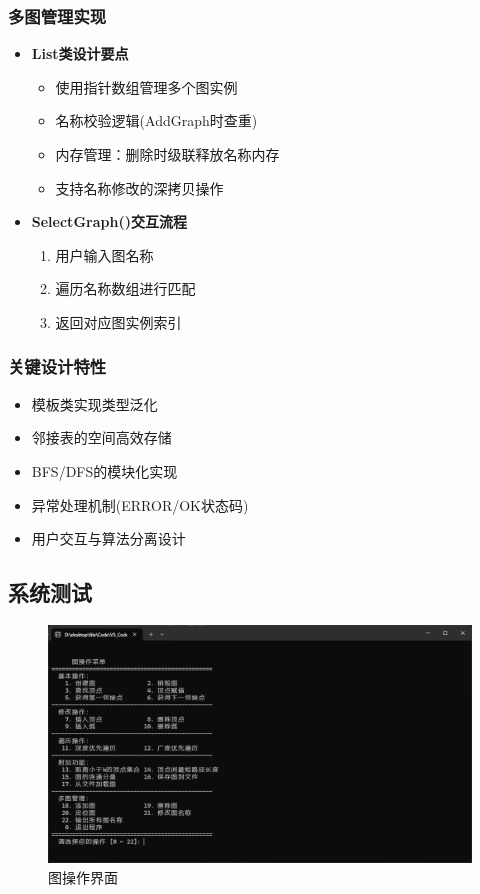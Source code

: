 \documentclass[supercite]{Experimental_Report}
\theoremstyle{definition}
\begin{document}
\subsubsection*{多图管理实现}
\begin{itemize}
    \item \textbf{List类设计要点}
    \begin{itemize}
        \item 使用指针数组管理多个图实例
        \item 名称校验逻辑(AddGraph时查重)
        \item 内存管理：删除时级联释放名称内存
        \item 支持名称修改的深拷贝操作
    \end{itemize}
    
    \item \textbf{SelectGraph()交互流程}
    \begin{enumerate}
        \item 用户输入图名称
        \item 遍历名称数组进行匹配
        \item 返回对应图实例索引
    \end{enumerate}
\end{itemize}

\subsubsection*{关键设计特性}
\begin{itemize}
    \item 模板类实现类型泛化
    \item 邻接表的空间高效存储
    \item BFS/DFS的模块化实现
    \item 异常处理机制(ERROR/OK状态码)
    \item 用户交互与算法分离设计
\end{itemize}


\subsection{系统测试}

\begin{figure}[htb]
	\begin{center}
		\includegraphics[scale=0.30]{images/2-1.jpg}
		\caption{图操作界面}
		\label{fig2-1}
	\end{center}
\end{figure}
\end{document}
